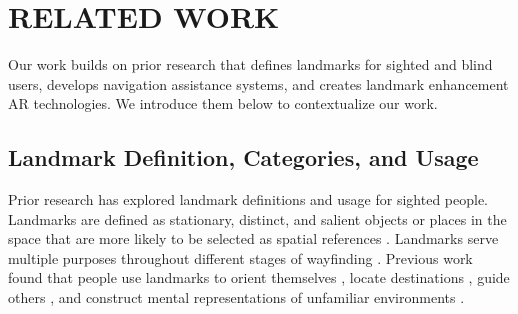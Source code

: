 \section{RELATED WORK}
Our work builds on prior research that defines landmarks for sighted and blind users, develops navigation assistance systems, and creates landmark enhancement AR technologies. We introduce them below to contextualize our work.


\subsection{Landmark Definition, Categories, and Usage}\label{Landmark Definition, Categories, and Usage}
Prior research has explored landmark definitions and usage for sighted people. Landmarks are defined as stationary, distinct, and salient objects or places in the space that are more likely to be selected as spatial references \cite{lynch1964image,millonig2007developing}. Landmarks serve multiple purposes throughout different stages of wayfinding \cite{yesiltepe2021landmarks}. Previous work found that people use landmarks to orient themselves \cite{downs2011cognitive,philbeck2005remembered}, locate destinations \cite{klippel2005structural}, guide others \cite{raubal2002enriching,tom2003referring, lovelace1999elements}, and construct mental representations of unfamiliar environments \cite{michon2001and}.

